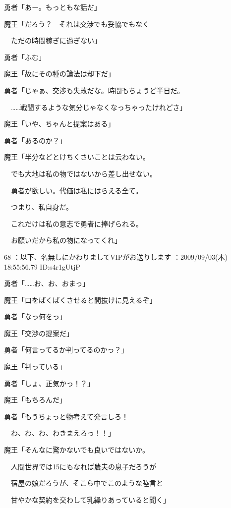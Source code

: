\documentclass[a4j,twocolumn]{tarticle}
\begin{document}
勇者「あー。もっともな話だ」 



魔王「だろう？　それは交渉でも妥協でもなく\par{} 
　ただの時間稼ぎに過ぎない」 



勇者「ふむ」 



魔王「故にその種の論法は却下だ」\par{} 
勇者「じゃぁ、交渉も失敗だな。時間もちょうど半日だ。\par{} 
　……戦闘するような気分じゃなくなっちゃったけれどさ」 



魔王「いや、ちゃんと提案はある」\par{} 
勇者「あるのか？」 



魔王「半分などとけちくさいことは云わない。\par{} 
　でも大地は私の物ではないから差し出せない。\par{} 
　勇者が欲しい。代価は私にはらえる全て。\par{} 
　つまり、私自身だ。\par{} 
　これだけは私の意志で勇者に捧げられる。\par{} 
　お願いだから私の物になってくれ」 

	
    
    

68 ：以下、名無しにかわりましてVIPがお送りします ：2009/09/03(木) 18:55:56.79 ID:s4r1gUtjP 


勇者「……お、お、おまっ」\par{} 
魔王「口をぱくぱくさせると間抜けに見えるぞ」\par{} 
勇者「なっ何をっ」 



魔王「交渉の提案だ」\par{} 
勇者「何言ってるか判ってるのかっ？」 



魔王「判っている」\par{} 
勇者「しょ、正気かっ！？」 



魔王「もちろんだ」\par{} 
勇者「もうちょっと物考えて発言しろ！\par{} 
　わ、わ、わ、わきまえろっ！！」 



魔王「そんなに驚かないでも良いではないか。\par{} 
　人間世界では15にもなれば農夫の息子だろうが \par{}
　宿屋の娘だろうが、そこら中でこのような睦言と\par{} 
　甘やかな契約を交わして乳繰りあっていると聞く」 
\end{document}
